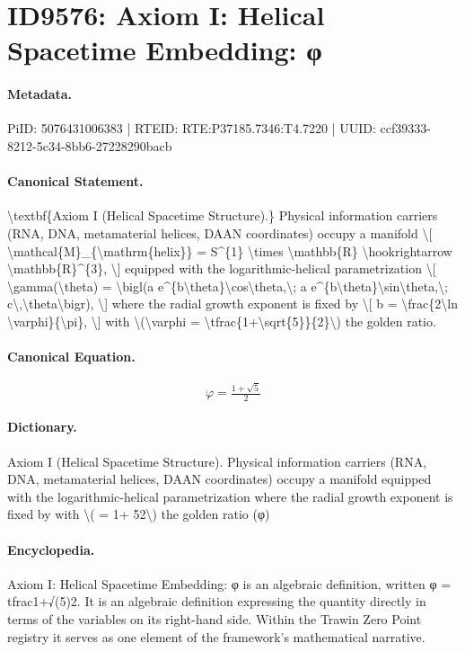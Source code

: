 \section*{ID9576: Axiom I: Helical Spacetime Embedding: φ}
\paragraph{Metadata.}
PiID: 5076431006383 | RTEID: RTE:P37185.7346:T4.7220 | UUID: ccf39333-8212-5c34-8bb6-27228290bacb

\paragraph{Canonical Statement.}
\textbackslash{}textbf\{Axiom I (Helical Spacetime Structure).\} Physical information carriers (RNA, DNA, metamaterial helices, DAAN coordinates) occupy a manifold \textbackslash{}[ \textbackslash{}mathcal\{M\}\_\{\textbackslash{}mathrm\{helix\}\} = S\textasciicircum{}\{1\} \textbackslash{}times \textbackslash{}mathbb\{R\} \textbackslash{}hookrightarrow \textbackslash{}mathbb\{R\}\textasciicircum{}\{3\}, \textbackslash{}] equipped with the logarithmic-helical parametrization \textbackslash{}[ \textbackslash{}gamma(\textbackslash{}theta) = \textbackslash{}bigl(a e\textasciicircum{}\{b\textbackslash{}theta\}\textbackslash{}cos\textbackslash{}theta,\textbackslash{}; a e\textasciicircum{}\{b\textbackslash{}theta\}\textbackslash{}sin\textbackslash{}theta,\textbackslash{}; c\textbackslash{},\textbackslash{}theta\textbackslash{}bigr), \textbackslash{}] where the radial growth exponent is fixed by \textbackslash{}[ b = \textbackslash{}frac\{2\textbackslash{}ln \textbackslash{}varphi\}\{\textbackslash{}pi\}, \textbackslash{}] with \textbackslash{}(\textbackslash{}varphi = \textbackslash{}tfrac\{1+\textbackslash{}sqrt\{5\}\}\{2\}\textbackslash{}) the golden ratio.

\paragraph{Canonical Equation.}
\[
\varphi = \tfrac{1+\sqrt{5}}{2}
\]

\paragraph{Dictionary.}
Axiom I (Helical Spacetime Structure). Physical information carriers (RNA, DNA, metamaterial helices, DAAN coordinates) occupy a manifold equipped with the logarithmic-helical parametrization where the radial growth exponent is fixed by with \textbackslash{}( = 1+ 52\textbackslash{}) the golden ratio (φ)

\paragraph{Encyclopedia.}
Axiom I: Helical Spacetime Embedding: φ is an algebraic definition, written φ = tfrac1+√(5)2. It is an algebraic definition expressing the quantity directly in terms of the variables on its right-hand side. Within the Trawin Zero Point registry it serves as one element of the framework's mathematical narrative.
